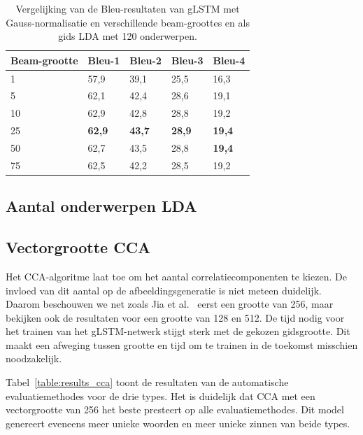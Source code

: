     \begin{table}
    	\centering
    	\begin{tabular}{lllll}
    		Beam-grootte & Bleu-1 & Bleu-2 & Bleu-3 & Bleu-4  \\ \hline
    		1	      & 57,9   & 39,1   & 25,5   & 16,3        \\ 
    		5         & 62,1   & 42,4   & 28,6   & 19,1     \\
    		10        & 62,9   & 42,8   & 28,8   & 19,2    \\
    		25        & \textbf{62,9}   & \textbf{43,7}   & \textbf{28,9}   & \textbf{19,4}     \\
    		50		  & 62,7   & 43,5   & 28,8   & \textbf{19,4}    \\
    		75        & 62,5   & 42,2   & 28,5   & 19,2    \\ \hline
    	\end{tabular}
    	\caption{Vergelijking van de Bleu-resultaten van gLSTM met Gauss-normalisatie en verschillende beam-groottes en als gids LDA met 120 onderwerpen.}	
    	\label{table:beam_gauss}
    \end{table}



\subsection{Aantal onderwerpen LDA}

\subsection{Vectorgrootte CCA} 
Het CCA-algoritme laat toe om het aantal correlatiecomponenten te kiezen. De invloed van dit aantal op de afbeeldingsgeneratie is niet meteen duidelijk. Daarom beschouwen we net zoals Jia et al.~\cite{Fernando2015} eerst een grootte van 256, maar bekijken ook de resultaten voor een grootte van 128 en 512. De tijd nodig voor het trainen van het gLSTM-netwerk stijgt sterk met de gekozen gidsgrootte. Dit maakt een afweging tussen grootte en tijd om te trainen in de toekomst misschien noodzakelijk.

Tabel~\ref{table:results_cca} toont de resultaten van de automatische evaluatiemethodes voor de drie types. Het is duidelijk dat CCA met een vectorgrootte van 256 het beste presteert op alle evaluatiemethodes. Dit model genereert eveneens meer unieke woorden en meer unieke zinnen van beide types.

